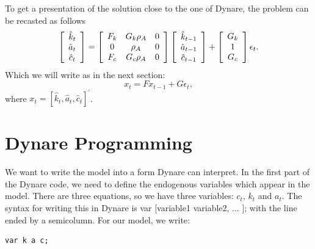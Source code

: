 \documentclass[a4paper,12pt]{article}%
\begin{document}
To get a presentation of the solution close to the one of Dynare, the problem
can be recasted as follows%
\begin{equation}
\left[
\begin{array}
[c]{c}%
\hat{k}_{t}\\
\hat{a}_{t}\\
\hat{c}_{t}%
\end{array}
\right]  =\left[
\begin{array}
[c]{ccc}%
F_{k} & G_{k}\rho_{A} & 0\\
0 & \rho_{A} & 0\\
F_{c} & G_{c}\rho_{A} & 0
\end{array}
\right]  \left[
\begin{array}
[c]{c}%
\hat{k}_{t-1}\\
\hat{a}_{t-1}\\
\hat{c}_{t-1}%
\end{array}
\right]  +\left[
\begin{array}
[c]{c}%
G_{k}\\
1\\
G_{c}%
\end{array}
\right]  \epsilon_{t}. \label{eq PQ full}%
\end{equation}
Which we will write as in the next section:%
\begin{equation}
x_{t}=Fx_{t-1}+G\epsilon_{t}, \label{eq PQ compact}%
\end{equation}
where $x_{t}=[\hat{k}_{t},\hat{a}_{t},\hat{c}_{t}]^{\prime}$.%

%


\newpage

\section{Dynare Programming}

We want to write the model into a form Dynare can interpret. In the first part
of the Dynare code, we need to define the endogenous variables which appear in
the model. There are three equations, so we have three variables: $c_{t}$,
$k_{t}$ and $a_{t}$. The syntax for writing this in Dynare is \textsf{var
[variable1 variable2, ... ]}; with the line ended by a semicolumn. For our
model, we write:%

\vspace{1ex}
\begin{verbatim}
var k a c;
\end{verbatim}
\vspace{1ex}%
\end{document}
